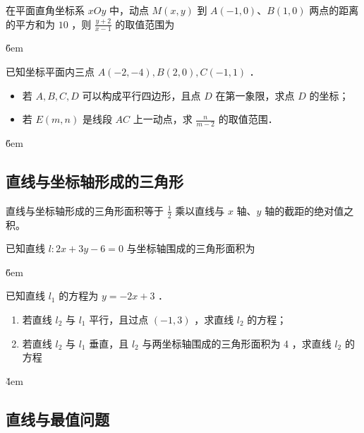 \begin{example}
    在平面直角坐标系 $x O y$ 中，动点 $M(x, y)$ 到 $A(-1,0) 、 B(1,0)$ 两点的距离的平方和为 $10$ ，则 $\frac{y+2}{x-1}$ 的取值范围为 \underline{\qquad}
\end{example}

\v{6em}

\begin{example}
    已知坐标平面内三点 $A(-2,-4), B(2,0), C(-1,1)$ ．
    \begin{itemize}
        \item[(1)] 若 $A, B, C, D$ 可以构成平行四边形，且点 $D$ 在第一象限，求点 $D$ 的坐标；
        \item[(2)] 若 $E(m, n)$ 是线段 $A C$ 上一动点，求 $\frac{n}{m-2}$ 的取值范围．
    \end{itemize}
\end{example}

\v{6em}

\subsection{直线与坐标轴形成的三角形}

\begin{theorem}
    直线与坐标轴形成的三角形面积等于 $\frac{1}{2}$ 乘以直线与 $x$ 轴、$y$ 轴的截距的绝对值之积。
\end{theorem}

\begin{example}
    已知直线 $l: 2 x+3 y-6=0$ 与坐标轴围成的三角形面积为 \underline{\qquad}
\end{example}

\v{6em}

\begin{example}
    已知直线 $l_1$ 的方程为 $y=-2 x+3$ ．
    \begin{enumerate}
        \item 若直线 $l_2$ 与 $l_1$ 平行，且过点 $(-1,3)$ ，求直线 $l_2$ 的方程；

        \item 若直线 $l_2$ 与 $l_1$ 垂直，且 $l_2$ 与两坐标轴围成的三角形面积为 4 ，求直线 $l_2$ 的方程
    \end{enumerate}
\end{example}

\v{4em}

\subsection{直线与最值问题}

